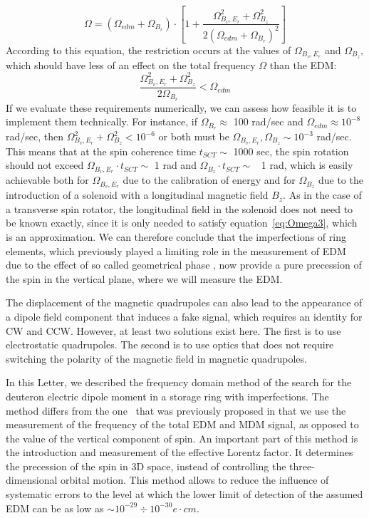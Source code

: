 \documentclass[a4paper]{jacow}
\begin{document}
\begin{equation}\label{eq:Omega2}
\Omega=\left(\Omega_{edm}+\Omega_{B_r}\right)\cdot\left[1+\frac{\Omega_{B_v,E_r}^{2}+\Omega_{B_z}^{2}}{2\left(\Omega_{edm}+\Omega_{B_r}\right)^{2}}\right]	
\end{equation}
According to this equation, the restriction occurs at the values of $\Omega_{B_v,E_r}$   and $\Omega_{B_z}$, which should have less of an effect on the total frequency $\Omega$   than the EDM:
\begin{equation}\label{eq:Omega3}
\frac{\Omega_{B_v,E_r}^{2}+\Omega_{B_z}^{2}}{2\Omega_{B_r}}<\Omega_{edm}\end{equation}
If we evaluate these requirements numerically, we can assess how feasible it is to implement them technically. For instance, if $\Omega_{B_r}\approx$ 100 rad/sec and $\Omega_{edm}\approx10^{-8}$  rad/sec, then $\Omega_{B_v,E_r}^{2}+\Omega_{B_z}^{2}<10^{-6}$   or both must be $\Omega_{B_v,E_r}, \Omega_{B_z}\sim10^{-3}$ rad/sec. This means that at the spin coherence time $t_{SCT}\sim$ 1000 sec, the spin rotation should not exceed $\Omega_{B_v,E_r}\cdot t_{SCT}\sim$  1 rad and $\Omega_{B_z}\cdot t_{SCT}\sim$  ~1 rad, which is easily achievable both for $\Omega_{B_v,E_r}$   due to the calibration of energy and for $\Omega_{B_z}$   due to the introduction of a solenoid with a longitudinal magnetic field ${B_z}$. As in the case of a transverse spin rotator, the longitudinal field in the solenoid does not need to be known exactly, since it is only needed to satisfy equation~\eqref{eq:Omega3}, which is an approximation. We can therefore conclude that the imperfections of ring elements, which previously played a limiting role in the measurement of EDM due to the effect of so called geometrical phase \cite{AGS_proposal}, now provide a pure precession of the spin in the vertical plane, where we will measure the EDM.

The displacement of the magnetic quadrupoles can also lead to the appearance of a dipole field component that induces a fake signal, which requires an identity for CW and CCW. However, at least two solutions exist here. The first is to use electrostatic quadrupoles. The second is to use optics that does not require switching the polarity of the magnetic field in magnetic quadrupoles.

In this Letter, we described the frequency domain method of the search for the deuteron electric dipole moment in a storage ring with imperfections. The method differs from the one~\cite{Farley,AGS_proposal} that was previously proposed in that we use the measurement of the frequency of the total EDM and MDM signal, as opposed to the value of the vertical component of spin. An important part of this method is the introduction and measurement of the effective Lorentz factor. It determines the precession of the spin in 3D space, instead of controlling the three-dimensional orbital motion. This method allows to reduce the influence of systematic errors to the level at which the lower limit of detection of the assumed EDM can be as low as $\sim 10^{-29}\div 10^{-30}e\cdot cm$. 
\end{document}
